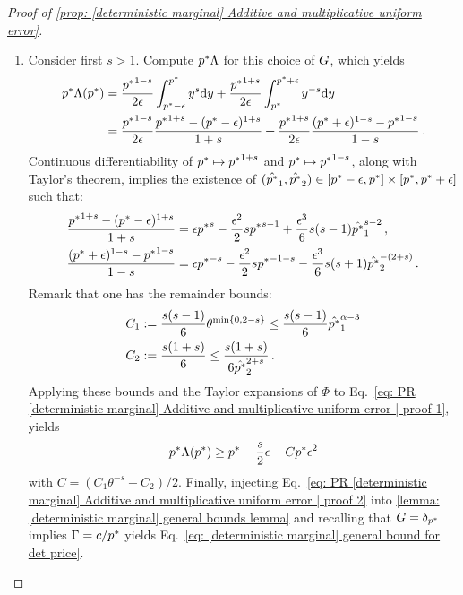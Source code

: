 
\DeterministicMarginalsUniformError*

\begin{proof}[{Proof of \cref{prop: [deterministic marginal] Additive and multiplicative uniform error}}]\hfill
    \begin{enumerate}
        \item  Consider first $s>1$. Compute $p^*\Lambda$ for this choice of $G$, which yields
        \begin{align}
            p^*\Lambda(p^*)&=\frac {{p^*}^{1-s}}{2\epsilon}\int_{p^*-\epsilon}^{p^*} y^{s}\mathrm{d} y + \frac{{p^*}^{1+s}}{2\epsilon}\int_{p^*}^{p^*+\epsilon} y^{-s}\mathrm{d} y\notag\\
            &= \frac {{p^*}^{1-s}}{2\epsilon} \frac{{p^*}^{1+s}-(p^*-\epsilon)^{1+s}}{1+s} + \frac{{p^*}^{1+s}}{2\epsilon}\frac{(p^*+\epsilon)^{1-s}-{p^*}^{1-s}}{1-s}\,.\label{eq: PR [deterministic marginal] Additive and multiplicative uniform error | proof 1}
        \end{align}
    Continuous differentiability of $p^*\mapsto {p^*}^{1+s}$ and $p^*\mapsto {p^*}^{1-s}$, along with Taylor's theorem, implies the existence of $(\hat {p^*}_1,\hat{p^*}_2)\in[p^*-\epsilon,p^*]\times[p^*,p^*+\epsilon]$ such that:
    \begin{align*}
        \frac{{p^*}^{1+s}-(p^*-\epsilon)^{1+s}}{1+s} &= \epsilon {p^*}^{s} -\frac{\epsilon^2}2s {p^*}^{s-1} + \frac{\epsilon^3}6s(s-1){\hat {p^*}_1}^{s-2}\,,\\
        \frac{(p^*+\epsilon)^{1-s}-{p^*}^{1-s}}{1-s}&= \epsilon {p^*}^{-s} - \frac{\epsilon^2}2s {p^*}^{-1-s} -\frac{\epsilon^3}6s(s+1){\hat{p^*}_2}^{-(2+s)}
        \,.
    \end{align*}
    Remark that one has the remainder bounds:
    \begin{align*}
        C_1&:= \frac{s(s-1)}{6}\theta^{\min\{0,2-s\}}\le \frac{s(s-1)}{6}{\hat{p^*}_1}^{\alpha-3}\\
        C_2&:= \frac{s(1+s)}{6}\le \frac{s(1+s)}{6{\hat{p^*}_2}^{2+s}}\,.
    \end{align*}
    Applying these bounds and the Taylor expansions of $\Phi$ to Eq.~\eqref{eq: PR [deterministic marginal] Additive and multiplicative uniform error | proof 1}, yields
    \begin{align}
             p^*\Lambda(p^*)\ge p^*-\frac{s}  2\epsilon -Cp^*\epsilon^2
    \label{eq: PR [deterministic marginal] Additive and multiplicative uniform error | proof 2}  
    \end{align}
    with $C=(C_1\theta^{-s}+C_2)/2$. Finally, injecting Eq.~\eqref{eq: PR [deterministic marginal] Additive and multiplicative uniform error | proof 2}  into \cref{lemma: [deterministic marginal] general bounds lemma} and recalling that $G=\delta_{p^*}$ implies $\Gamma=c/p^*$ yields Eq.~\eqref{eq: [deterministic marginal] general bound for det price}.


\end{enumerate}
\end{proof}
